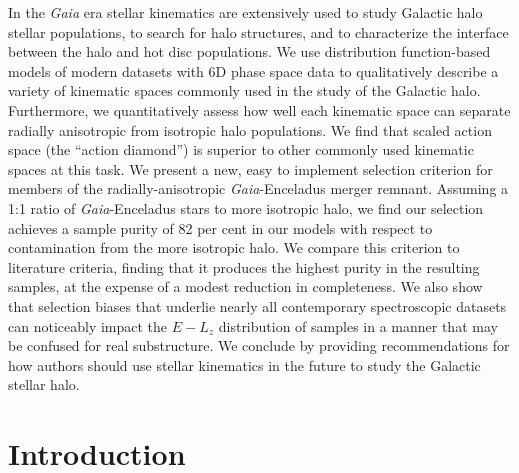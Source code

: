 In the \textit{Gaia} era stellar kinematics are extensively used to study Galactic halo stellar populations, to search for halo structures, and to characterize the interface between the halo and hot disc populations. We use distribution function-based models of modern datasets with 6D phase space data to qualitatively describe a variety of kinematic spaces commonly used in the study of the Galactic halo. Furthermore, we quantitatively assess how well each kinematic space can separate radially anisotropic from isotropic halo populations. We find that scaled action space (the ``action diamond'') is superior to other commonly used kinematic spaces at this task. We present a new, easy to implement selection criterion for members of the radially-anisotropic \textit{Gaia}-Enceladus merger remnant. Assuming a 1:1 ratio of \textit{Gaia}-Enceladus stars to more isotropic halo, we find our selection achieves a sample purity of 82 per cent in our models with respect to contamination from the more isotropic halo. We compare this criterion to literature criteria, finding that it produces the highest purity in the resulting samples, at the expense of a modest reduction in completeness. We also show that selection biases that underlie nearly all contemporary spectroscopic datasets can noticeably impact the $E-L_{z}$ distribution of samples in a manner that may be confused for real substructure. We conclude by providing recommendations for how authors should use stellar kinematics in the future to study the Galactic stellar halo. 




\section{Introduction}
\label{sec:Introduction}


